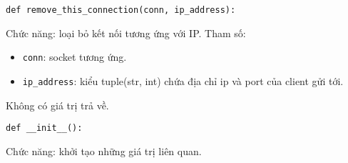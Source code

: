\begin{lstlisting}
def remove_this_connection(conn, ip_address):
\end{lstlisting}
Chức năng: loại bỏ kết nối tương ứng với IP.
Tham số:
\begin{itemize}
\item \lstinline{conn}: socket tương ứng.
\item \lstinline{ip_address}: kiểu tuple(str, int) chứa địa chỉ ip và port của client gửi tới.
\end{itemize}
Không có giá trị trả về.

\begin{lstlisting}
def __init__():
\end{lstlisting}
Chức năng: khởi tạo những giá trị liên quan.
